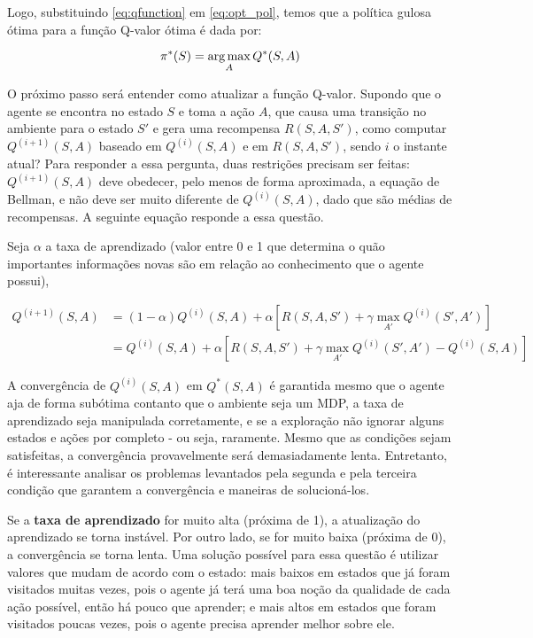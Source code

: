 Logo, substituindo \ref{eq:qfunction} em \ref{eq:opt_pol}, temos que a política gulosa ótima para a função Q-valor ótima é dada por:

\begin{equation} \label{eq:q_opt_pol}
\pi^{*}(S) = \operatorname*{arg\,max}_{A}Q^{*}(S,A)
\end{equation}

O próximo passo será entender como atualizar a função Q-valor.
Supondo que o agente se encontra no estado $S$ e toma a ação $A$, que causa uma transição no ambiente para o estado $S'$ e gera uma recompensa $R(S,A,S')$, como computar $Q^{(i+1)}(S,A)$ baseado em $Q^{(i)}(S,A)$ e em $R(S,A,S')$, sendo $i$ o instante atual?
Para responder a essa pergunta, duas restrições precisam ser feitas: $Q^{(i+1)}(S,A)$ deve obedecer, pelo menos de forma aproximada, a equação de Bellman, e não deve ser muito diferente de $Q^{(i)}(S,A)$, dado que são médias de recompensas.
A seguinte equação responde a essa questão.

Seja $\alpha$ a taxa de aprendizado (valor entre 0 e 1 que determina o quão importantes informações novas são em relação ao conhecimento que o agente possui),

\begin{equation} \label{eq:q_update}
\begin{align*}
Q^{(i+1)}(S,A) &= (1-\alpha)Q^{(i)}(S,A) + \alpha[R(S,A,S') + \gamma \max_{A'}Q^{(i)}(S',A')] \\
            &= Q^{(i)}(S,A) + \alpha[R(S,A,S') + \gamma \max_{A'}Q^{(i)}(S',A') - Q^{(i)}(S,A)]
\end{align*}
\end{equation}

A convergência de $Q^{(i)}(S,A)$ em $Q^{*}(S,A)$ é garantida mesmo que o agente aja de forma subótima contanto que o ambiente seja um MDP, a taxa de aprendizado seja manipulada corretamente, e se a exploração não ignorar alguns estados e ações por completo - ou seja, raramente.
Mesmo que as condições sejam satisfeitas, a convergência provavelmente será demasiadamente lenta.
Entretanto, é interessante analisar os problemas levantados pela segunda e pela terceira condição que garantem a convergência e maneiras de solucioná-los.

Se a \textbf{taxa de aprendizado} for muito alta (próxima de 1), a atualização do aprendizado se torna instável.
Por outro lado, se for muito baixa (próxima de 0), a convergência se torna lenta.
Uma solução possível para essa questão é utilizar valores que mudam de acordo com o estado:
mais baixos em estados que já foram visitados muitas vezes, pois o agente já terá uma boa noção da qualidade de cada ação possível, então há pouco que aprender;
e mais altos em estados que foram visitados poucas vezes, pois o agente precisa aprender melhor sobre ele.

